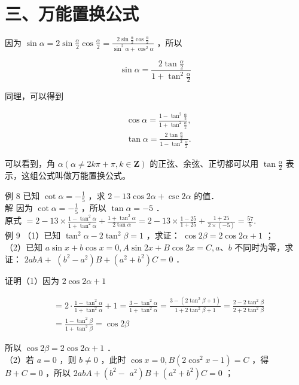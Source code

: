 \documentclass[10pt]{article}
\begin{document}
\section*{三、万能置换公式}
因为 \(\sin \alpha=2 \sin \frac{\alpha}{2} \cos \frac{\alpha}{2}=\frac{2 \sin \frac{\alpha}{2} \cos \frac{\alpha}{2}}{\sin ^{2} \alpha+\cos ^{2} \alpha}\) ，所以

\[
\sin \alpha=\frac{2 \tan \frac{\alpha}{2}}{1+\tan ^{2} \frac{\alpha}{2}}
\]

同理，可以得到

\[
\begin{aligned}
& \cos \alpha=\frac{1-\tan ^{2} \frac{\alpha}{2}}{1+\tan ^{2} \frac{\alpha}{2}}, \\
& \tan \alpha=\frac{2 \tan \frac{\alpha}{2}}{1-\tan ^{2} \frac{\alpha}{2}} .
\end{aligned}
\]

可以看到，角 \(\alpha(\alpha \neq 2 k \pi+\pi, k \in \mathbf{Z})\) 的正弦、余弦、正切都可以用 \(\tan \frac{\alpha}{2}\) 表示，这组公式叫做万能置换公式。

例 8 已知 \(\cot \alpha=-\frac{1}{5}\) ，求 \(2-13 \cos 2 \alpha+\csc 2 \alpha\) 的值．\\
解 因为 \(\cot \alpha=-\frac{1}{5}\) ，所以 \(\tan \alpha=-5\) ．\\
原式 \(=2-13 \times \frac{1-\tan ^{2} \alpha}{1+\tan ^{2} \alpha}+\frac{1+\tan ^{2} \alpha}{2 \tan \alpha}=2-13 \times \frac{1-25}{1+25}+\frac{1+25}{2 \times(-5)}=\frac{57}{5}\).\\
例 9 （1）已知 \(\tan ^{2} \alpha-2 \tan ^{2} \beta=1\) ，求证： \(\cos 2 \beta=2 \cos 2 \alpha+1\) ；\\
（2）已知 \(a \sin x+b \cos x=0, A \sin 2 x+B \cos 2 x=C, a 、 b\) 不同时为零，求证： \(2 a b A+\) \(\left(b^{2}-a^{2}\right) B+\left(a^{2}+b^{2}\right) C=0\) ．

证明（1）因为 \(2 \cos 2 \alpha+1\)

\[
\begin{aligned}
& =2 \cdot \frac{1-\tan ^{2} \alpha}{1+\tan ^{2} \alpha}+1=\frac{3-\tan ^{2} \alpha}{1+\tan ^{2} \alpha}=\frac{3-\left(2 \tan ^{2} \beta+1\right)}{1+2 \tan ^{2} \beta+1}=\frac{2-2 \tan ^{2} \beta}{2+2 \tan ^{2} \beta} \\
& =\frac{1-\tan ^{2} \beta}{1+\tan ^{2} \beta}=\cos 2 \beta
\end{aligned}
\]

所以 \(\cos 2 \beta=2 \cos 2 \alpha+1\) ．\\
（2）若 \(a=0\) ，则 \(b \neq 0\) ，此时 \(\cos x=0, B\left(2 \cos ^{2} x-1\right)=C\) ，得 \(B+C=0\) ，所以 \(2 a b A+\left(b^{2}-\right.\) \(\left.a^{2}\right) B+\left(a^{2}+b^{2}\right) C=0\) ；
\end{document}
